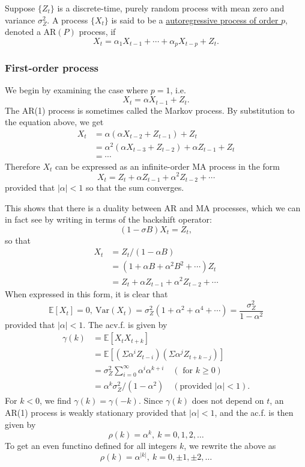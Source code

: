\begin{definition*}[]
Suppose $\{ Z_t \}$ is a discrete-time, purely random process with mean zero and variance $\sigma_Z^2$. A 
process $\{ X_t \}$ is said to be a \underline{autoregressive process of order $p$}, denoted a $\mathrm{AR}(P)$ 
process, if 
\[ X_t = \alpha_1 X_{t-1} + \cdots + \alpha_p X_{t-p} + Z_t. \]
\end{definition*}


\subsubsection{First-order process}
We begin by examining the case where $p = 1$, i.e.
\[ X_t = \alpha X_{t-1} + Z_t. \]
The AR(1) process is sometimes called the Markov process. By substitution to the equation above, we get 
\begin{align*}
	X_t 
	&= \alpha(\alpha X_{t-2} + Z_{t-1}) + Z_t \\
	&= \alpha^2(\alpha X_{t-3} + Z_{t-2}) + \alpha Z_{t-1} + Z_t \\
	&= \cdots
\end{align*}
Therefore $X_t$ can be expressed as an infinite-order MA process in the form 
\[ X_t = Z_t + \alpha Z_{t-1} + \alpha^2 Z_{t-2} + \cdots \]
provided that $|\alpha| < 1$ so that the sum converges.

This shows that there is a duality between AR and MA processes, which we can in fact see by writing in terms of 
the backshift operator:
\[ (1 - \sigma B)X_t = Z_t, \]
so that 
\begin{align*}
	X_t 
	&= Z_t / (1 - \alpha B) \\
	&= (1 + \alpha B + \alpha^2 B^2 + \cdots) Z_t \\
	&= Z_t + \alpha Z_{t-1} + \alpha^2 Z_{t-2} + \cdots
\end{align*}
When expressed in this form, it is clear that 
\[ \mathbb{E}\left[ X_t \right] = 0, \ 
\mathrm{Var}(X_t) = \sigma_Z^2 (1 + \alpha^2 + \alpha^4 + \cdots) = \frac{\sigma_Z^2}{1 - \alpha^2} \]
provided that $|\alpha| < 1$. The acv.f. is given by 
\begin{align*}
	\gamma(k) 
	&= \mathbb{E}\left[ X_t X_{t+k} \right] \\
	&= \mathbb{E}\left[ (\Sigma \alpha^i Z_{t-i})(\Sigma \alpha^j Z_{t+k-j}) \right] \\
	&= \sigma_Z^2 \sum_{i = 0}^{\infty} \alpha^i \alpha^{k+i} \quad (\text{ for } k \geq 0) \\
	&= \alpha^k \sigma_Z^2 / (1 - \alpha^2) \quad (\text{provided } |\alpha| < 1).
\end{align*}
For $k < 0$, we find $\gamma(k) = \gamma(-k)$. Since $\gamma(k)$ does not depend on $t$, an AR(1) process is 
weakly stationary provided that $|\alpha| < 1$, and the ac.f. is then given by 
\[ \rho(k) = \alpha^k, \ k = 0, 1, 2, \dots \]
To get an even functino defined for all integers $k$, we rewrite the above as 
\[ \rho(k) = \alpha^{|k|}, \ k = 0, \pm 1, \pm 2, \dots \]

